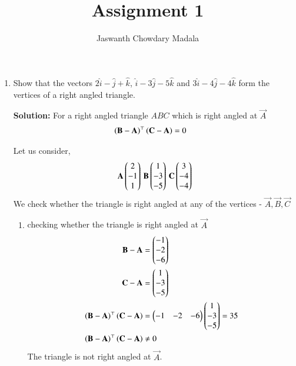 \documentclass[journal,12pt,twocolumn]{IEEEtran}
\begin{document}
\vspace{3cm}


\title{Assignment 1}
\author{Jaswanth Chowdary Madala}





\maketitle

\newpage


\bigskip

\renewcommand{\thefigure}{\theenumi}
\renewcommand{\thetable}{\theenumi}


\begin{enumerate}

\item Show that the vectors $2\hat{i}-\hat{j}+\hat{k}$, $\hat{i}-3\hat{j}-5\hat{k}$ and $3\hat{i}-4\hat{j}-4\hat{k}$ form the vertices of a right angled triangle.

\textbf{Solution:} For a right angled triangle $ABC$ which is right angled at $\vec{A}$  
\begin{align}
\left(\mathbf{B}-\mathbf{A}\right)^{\top}\left(\mathbf{C}-\mathbf{A}\right) &= 0
\end{align}

Let us consider, 
\begin{align}
\mathbf{A}\begin{pmatrix}2\\-1\\1\end{pmatrix} \, \mathbf{B}\begin{pmatrix}1\\-3\\-5\end{pmatrix} \, \mathbf{C}\begin{pmatrix}3\\-4\\-4\end{pmatrix} 
\end{align}
We check whether the triangle is right angled at any of the vertices -
$ \vec{A}, \vec{B}, \vec{C}$
 
\begin{enumerate}
\item checking whether the triangle is right angled at $\vec{A}$
\begin{align}
\mathbf{B}-\mathbf{A} &= \begin{pmatrix}-1\\-2\\-6\end{pmatrix} \\
\mathbf{C}-\mathbf{A} &= \begin{pmatrix}1\\-3\\-5\end{pmatrix} \\
\left(\mathbf{B}-\mathbf{A}\right)^{\top}\left(\mathbf{C}-\mathbf{A}\right) &= \begin{pmatrix}-1&-2&-6\end{pmatrix}\begin{pmatrix}1\\-3\\-5\end{pmatrix} = 35\\
\left(\mathbf{B}-\mathbf{A}\right)^{\top}\left(\mathbf{C}-\mathbf{A}\right) &\neq 0
\end{align}
The triangle is not right angled at $\vec{A}$.\\


\end{enumerate}
\end{enumerate}
\end{document}
